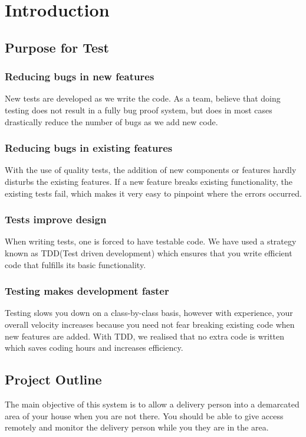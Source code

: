 \documentclass[11pt]{article}
\begin{document}
\newpage
\tableofcontents
\section{Introduction}
\subsection{Purpose for Test}
\subsubsection{Reducing bugs in new features}
New tests are developed as we write the code. As a team, believe that doing testing does not result in a fully bug proof system, but does in most cases drastically reduce the number of bugs as we add new code.

\subsubsection{Reducing bugs in existing features}
With the use of quality tests, the addition of new components or features hardly disturbs the existing features. If a new feature breaks existing functionality, the existing tests fail, which makes it very easy to pinpoint where the errors occurred.

\subsubsection{Tests improve design}
When writing tests, one is forced to have testable code. We have used a strategy known as TDD(Test driven development) which ensures that you write efficient code that fulfills its basic functionality.

\subsubsection{Testing makes development faster}
Testing slows you down on a class-by-class basis, however with experience, your overall velocity increases because you need not fear breaking existing code when new features are added. With TDD, we realised that no extra code is written which saves coding hours and increases efficiency.  

\subsection{Project Outline}
The main objective of this system is to allow a delivery person into a demarcated area of your house when you are not there. You should be able to give access remotely and monitor the delivery person while you they are in the area.
\end{document}

